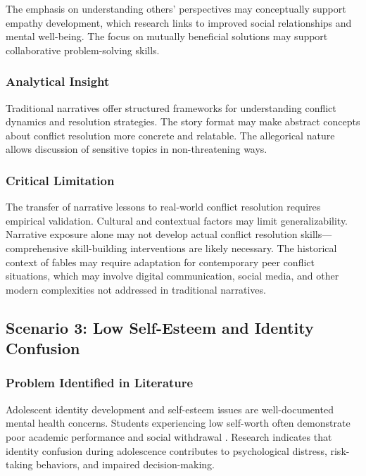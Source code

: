 \documentclass[12pt,a4paper,twocolumn]{article}
\begin{document}
The emphasis on understanding others' perspectives may conceptually support empathy development, which research links to improved social relationships and mental well-being. The focus on mutually beneficial solutions may support collaborative problem-solving skills.

\subsubsection{Analytical Insight}

Traditional narratives offer structured frameworks for understanding conflict dynamics and resolution strategies. The story format may make abstract concepts about conflict resolution more concrete and relatable. The allegorical nature allows discussion of sensitive topics in non-threatening ways.

\subsubsection{Critical Limitation}

The transfer of narrative lessons to real-world conflict resolution requires empirical validation. Cultural and contextual factors may limit generalizability. Narrative exposure alone may not develop actual conflict resolution skills—comprehensive skill-building interventions are likely necessary. The historical context of fables may require adaptation for contemporary peer conflict situations, which may involve digital communication, social media, and other modern complexities not addressed in traditional narratives.

\subsection{Scenario 3: Low Self-Esteem and Identity Confusion}

\subsubsection{Problem Identified in Literature}

Adolescent identity development and self-esteem issues are well-documented mental health concerns. Students experiencing low self-worth often demonstrate poor academic performance and social withdrawal \citep{Singh2021}. Research indicates that identity confusion during adolescence contributes to psychological distress, risk-taking behaviors, and impaired decision-making.
\end{document}
